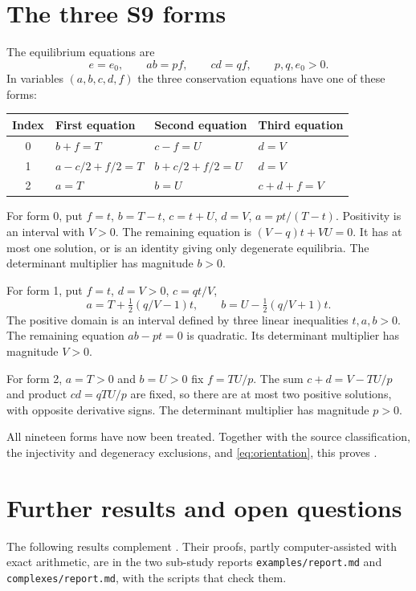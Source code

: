\documentclass[11pt,a4paper]{report}
\begin{document}
\section{The three S9 forms}
The equilibrium equations are
\[
 e=e_0,\qquad ab=pf,\qquad cd=qf,\qquad p,q,e_0>0.
\]
In variables $(a,b,c,d,f)$ the three conservation equations have one of these forms:
\begin{center}\small
\begin{tabular}{clll}
\toprule
Index & First equation & Second equation & Third equation\\
\midrule
0 &$b+f=T$ &$c-f=U$ &$d=V$\\
1 &$a-c/2+f/2=T$ &$b+c/2+f/2=U$ &$d=V$\\
2 &$a=T$ &$b=U$ &$c+d+f=V$\\
\bottomrule
\end{tabular}
\end{center}
For form 0, put $f=t$, $b=T-t$, $c=t+U$, $d=V$, $a=pt/(T-t)$.
Positivity is an interval with $V>0$. The remaining equation is
$(V-q)t+VU=0$. It has at most one solution, or is an identity giving only degenerate equilibria.
The determinant multiplier has magnitude $b>0$.

For form 1, put $f=t$, $d=V>0$, $c=qt/V$,
\[
 a=T+\tfrac12(q/V-1)t,\qquad
 b=U-\tfrac12(q/V+1)t.
\]
The positive domain is an interval defined by three linear inequalities $t,a,b>0$.
The remaining equation $ab-pt=0$ is quadratic. Its determinant multiplier has magnitude $V>0$.

For form 2, $a=T>0$ and $b=U>0$ fix $f=TU/p$.
The sum $c+d=V-TU/p$ and product $cd=qTU/p$ are fixed, so there are at most two positive
solutions, with opposite derivative signs. The determinant multiplier has magnitude $p>0$.

All nineteen forms have now been treated. Together with the source classification, the injectivity
and degeneracy exclusions, and \eqref{eq:orientation}, this proves .

\section{Further results and open questions}\label{sec:further}

The following results complement . Their proofs, partly computer-assisted with exact arithmetic, are
in the two sub-study reports \texttt{examples/report.md} and \texttt{complexes/report.md}, with the scripts that
check them.
\end{document}
